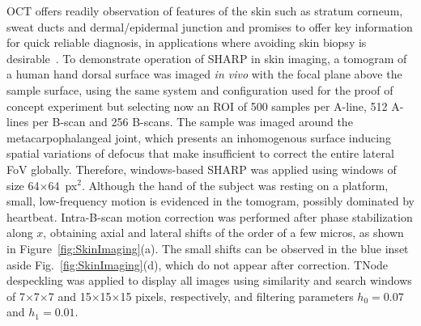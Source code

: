 OCT offers readily observation of features of the skin such as stratum corneum, sweat ducts and dermal/epidermal junction and promises to offer key information for quick reliable diagnosis, in applications where avoiding skin biopsy is desirable~\cite{Holmes2015_OCT}. To demonstrate operation of SHARP in skin imaging, a tomogram of a human hand dorsal surface was imaged \textit{in vivo} with the focal plane above the sample surface, using the same system and configuration used for the proof of concept experiment but selecting now an ROI of 500 samples per A-line, 512 A-lines per B-scan and 256 B-scans. The sample was imaged around the metacarpophalangeal joint, which presents an inhomogenous surface inducing spatial variations of defocus that make insufficient to correct the entire lateral FoV globally. Therefore, windows-based SHARP was applied using windows of size 64$\times$64~px$^2$. Although the hand of the subject was resting on a platform, small, low-frequency motion is evidenced in the tomogram, possibly dominated by heartbeat. Intra-B-scan motion correction was performed after phase stabilization along $x$, obtaining axial and lateral shifts of the order of a few micros, as shown in Figure~\ref{fig:SkinImaging}(a). The small shifts can be observed in the  blue inset aside Fig.~\ref{fig:SkinImaging}(d), which do not appear after correction. TNode despeckling was applied to display all images using similarity and search windows of 7$\times$7$\times$7 and 15$\times$15$\times$15 pixels, respectively, and filtering parameters $h_0 = 0.07$ and $h_1 = 0.01$.

